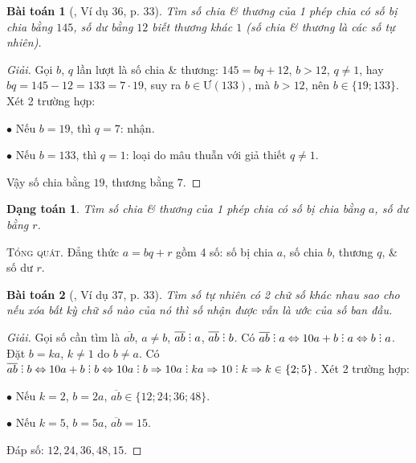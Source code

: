 \documentclass{article}
\numberwithin{equation}{section}
\newtheorem{dangtoan}{Dạng toán}[section]
\newtheorem{baitoan}{Bài toán}[section]
\DeclareRobustCommand{\divby}{%
	\mathrel{\vbox{\baselineskip.65ex\lineskiplimit0pt\hbox{.}\hbox{.}\hbox{.}}}%
}
\begin{document}
\begin{baitoan}[\cite{Binh_Toan_6_tap_1}, Ví dụ 36, p. 33]
	Tìm số chia \& thương của 1 phép chia có số bị chia bằng $145$, số dư bằng $12$ biết thương khác $1$ (số chia \& thương là các số tự nhiên).
\end{baitoan}

\begin{proof}[Giải]
	Gọi $b$, $q$ lần lượt là số chia \& thương: $145 = bq + 12$, $b > 12$, $q\ne 1$, hay $bq = 145 - 12 = 133 = 7\cdot 19$, suy ra $b\in\mbox{Ư}(133)$, mà $b > 12$, nên $b\in\{19;133\}$. Xét 2 trường hợp:
	\begin{enumerate*}
		\item[$\bullet$] Nếu $b = 19$, thì $q = 7$: nhận.
		\item[$\bullet$] Nếu $b = 133$, thì $q = 1$: loại do mâu thuẫn với giả thiết $q\ne 1$.
	\end{enumerate*}
	Vậy số chia bằng $19$, thương bằng $7$.
\end{proof}

\begin{dangtoan}
	Tìm số chia \& thương của 1 phép chia có số bị chia bằng $a$, số dư bằng $r$.
\end{dangtoan}

\textsc{Tổng quát.} Đẳng thức $a = bq + r$ gồm 4 số: số bị chia $a$, số chia $b$, thương $q$, \& số dư $r$.

\begin{baitoan}[\cite{Binh_Toan_6_tap_1}, Ví dụ 37, p. 33]
	Tìm số tự nhiên có 2 chữ số khác nhau sao cho nếu xóa bất kỳ chữ số nào của nó thì số nhận được vẫn là ước của số ban đầu.
\end{baitoan}

\begin{proof}[Giải]
	Gọi số cần tìm là $\overline{ab}$, $a\ne b$, $\overline{ab}\divby a$, $\overline{ab}\divby b$. Có $\overline{ab}\divby a\Leftrightarrow 10a + b\divby a\Leftrightarrow b\divby a$. Đặt $b = ka$, $k\ne 1$ do $b\ne a$. Có $\overline{ab}\divby b\Leftrightarrow 10a + b\divby b\Leftrightarrow 10a\divby b\Rightarrow 10a\divby ka\Rightarrow 10\divby k\Rightarrow k\in\{2;5\}$. Xét 2 trường hợp:
	\begin{enumerate*}
		\item[$\bullet$] Nếu $k = 2$, $b= 2a$, $\overline{ab}\in\{12;24;36;48\}$.
		\item[$\bullet$] Nếu $k = 5$, $b= 5a$, $\overline{ab} = 15$.
	\end{enumerate*}
	Đáp số: $12,24,36,48,15$.
\end{proof}
\end{document}

